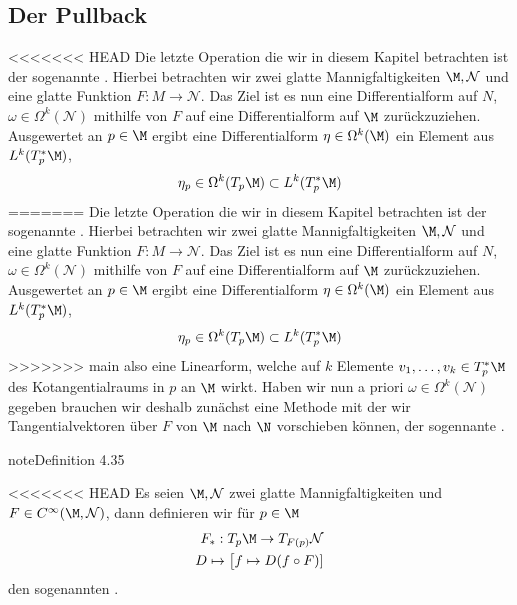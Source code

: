 \documentclass[letterpaper,10pt,english]{jupyterBook}
\begin{document}
\subsection{Der Pullback}
\label{\detokenize{manifolds/diffformen:der-pullback}}
<<<<<<< HEAD
\sphinxAtStartPar
Die letzte Operation die wir in diesem Kapitel betrachten ist der sogenannte . Hierbei betrachten wir zwei glatte Mannigfaltigkeiten \(\M,\mathcal{N}\) und eine glatte Funktion \(F:M\to\mathcal{N}\). Das Ziel ist es nun eine Differentialform auf \(N\), \(\omega\in\Omega^k(\mathcal{N})\) mithilfe von \(F\) auf eine Differentialform auf \(\M\) zurückzuziehen. Ausgewertet an \(p\in\M\) ergibt eine Differentialform \(\eta\in\Omega^k(\M)\) ein Element aus \(L^k(T_p^\ast\M)\),
\begin{equation*}
\begin{split}\eta_p\in \Omega^k(T_p\M) \subset L^k(T_p^\ast\M)\end{split}
\end{equation*}
\sphinxAtStartPar
=======
\sphinxAtStartPar
Die letzte Operation die wir in diesem Kapitel betrachten ist der sogenannte . Hierbei betrachten wir zwei glatte Mannigfaltigkeiten \(\M,\mathcal{N}\) und eine glatte Funktion \(F:M\to\mathcal{N}\). Das Ziel ist es nun eine Differentialform auf \(N\), \(\omega\in\Omega^k(\mathcal{N})\) mithilfe von \(F\) auf eine Differentialform auf \(\M\) zurückzuziehen. Ausgewertet an \(p\in\M\) ergibt eine Differentialform \(\eta\in\Omega^k(\M)\) ein Element aus \(L^k(T_p^\ast\M)\),
\begin{equation*}
\begin{split}\eta_p\in \Omega^k(T_p\M) \subset L^k(T_p^\ast\M)\end{split}
\end{equation*}
\sphinxAtStartPar
>>>>>>> main
also eine Linearform, welche auf \(k\) Elemente \(v_1,\ldots,v_k\in T_p^\ast\M\) des Kotangentialraums in \(p\) an \(\M\) wirkt. Haben wir nun a priori \(\omega\in\Omega^k(\mathcal{N})\) gegeben brauchen wir deshalb zunächst eine Methode mit der wir Tangentialvektoren über \(F\) von \(\M\) nach \(\N\) vorschieben können, der sogennante .
\label{manifolds/diffformen:definition-12}
\begin{sphinxadmonition}{note}{Definition 4.35}



<<<<<<< HEAD
\sphinxAtStartPar
Es seien \(\M,\mathcal{N}\) zwei glatte Mannigfaltigkeiten und \(F\in C^\infty(\M,\mathcal{N})\), dann definieren wir für \(p\in\M\)
\begin{equation*}
\begin{split}F_\ast:T_p\M\to T_{F(p)}\mathcal{N}\\
D\mapsto \big[f\mapsto D(f\circ F)]\end{split}
\end{equation*}
\sphinxAtStartPar
den sogenannten .
\end{sphinxadmonition}
\end{document}
